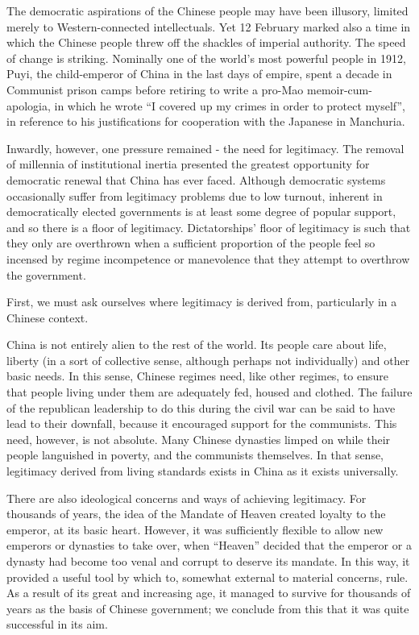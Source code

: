 \documentclass[10pt,a4paper,twocolumn]{article}
\begin{document}
The democratic aspirations of the Chinese people may have been illusory, limited merely to Western-connected intellectuals. Yet 12 February marked also a time in which the Chinese people threw off the shackles of imperial authority. The speed of change is striking. Nominally one of the world’s most powerful people in 1912, Puyi, the child-emperor of China in the last days of empire, spent a decade in Communist prison camps before retiring to write a pro-Mao memoir-cum-apologia, in which he wrote ``I covered up my crimes in order to protect myself”, in reference to his justifications for cooperation with the Japanese in Manchuria.

Inwardly, however, one pressure remained - the need for legitimacy. The removal of millennia of institutional inertia presented the greatest opportunity for democratic renewal that China has ever faced. Although democratic systems occasionally suffer from legitimacy problems due to low turnout, inherent in democratically elected governments is at least some degree of popular support, and so there is a floor of legitimacy. Dictatorships' floor of legitimacy is such that they only are overthrown when a sufficient proportion of the people feel so incensed by regime incompetence or manevolence that they attempt to overthrow the government.

First, we must ask ourselves where legitimacy is derived from, particularly in a Chinese context.

China is not entirely alien to the rest of the world. Its people care about life, liberty (in a sort of collective sense, although perhaps not individually) and other basic needs. In this sense, Chinese regimes need, like other regimes, to ensure that people living under them are adequately fed, housed and clothed. The failure of the republican leadership to do this during the civil war can be said to have lead to their downfall, because it encouraged support for the communists. This need, however, is not absolute. Many Chinese dynasties limped on while their people languished in poverty, and the communists themselves. In that sense, legitimacy derived from living standards exists in China as it exists universally.

There are also ideological concerns and ways of achieving legitimacy. For thousands of years, the idea of the Mandate of Heaven created loyalty to the emperor, at its basic heart. However, it was sufficiently flexible to allow new emperors or dynasties to take over, when ``Heaven'' decided that the emperor or a dynasty had become too venal and corrupt to deserve its mandate. In this way, it provided a useful tool by which to, somewhat external to material concerns, rule. As a result of its great and increasing age, it managed to survive for thousands of years as the basis of Chinese government; we conclude from this that it was quite successful in its aim. 
\end{document}
